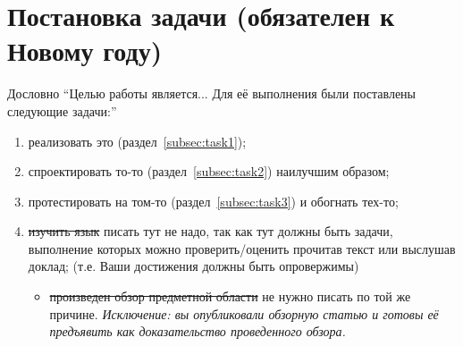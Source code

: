 
\section{Постановка задачи (обязателен к Новому году)}
\label{sec:task}
 Дословно \enquote{Целью работы является... Для её выполнения были постав\-лены следующие задачи:}
 \begin{enumerate}
 \item  реализовать это (раздел~\ref{subsec:task1});
 \item  спроектировать то-то (раздел~\ref{subsec:task2}) наилучшим образом;
 \item  протестировать на том-то (раздел~\ref{subsec:task3}) и обогнать тех-то;
 \item \sout{изучить язык \OCaml{}} писать тут не надо, так как тут должны быть задачи, выполнение которых можно проверить/оценить прочитав текст или выслушав доклад;
 (т.е. Ваши достижения должны быть опровержимы)
   \begin{itemize}
   \item \sout{произведен обзор предметной области} не нужно писать по той же причине. \emph{Исключение: вы опубликовали обзорную статью и готовы её предъявить как доказательство проведенного обзора.}
   \end{itemize}
 \end{enumerate}
